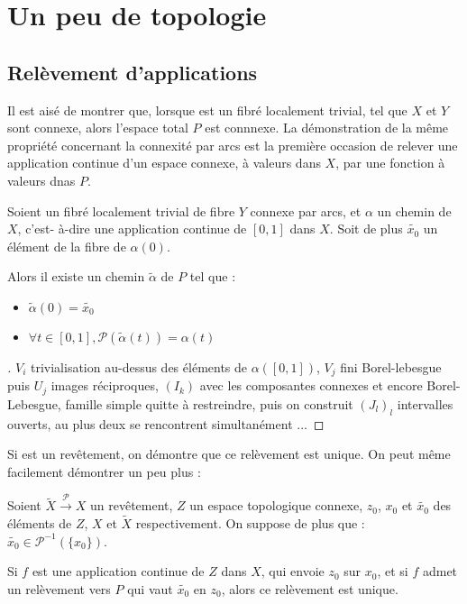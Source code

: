 
\section{Un peu de topologie}

\subsection{Rel\`evement d'applications}

Il est ais\'e de montrer que, lorsque \Fiy est un fibr\'e localement trivial, tel que $X$ et $Y$ sont connexe, alors l'espace total $P$ est connnexe. %
La d\'emonstration de la m\^eme propri\'et\'e concernant la connexit\'e par arcs est la premi\`ere occasion de relever une application continue d'un espace connexe, \`a valeurs dans $X$, %
par une fonction \`a valeurs dnas $P$.

\begin{prop}\label{rchefiy}
Soient \Fiy un fibr\'e localement trivial de fibre $Y$ connexe par arcs, et $\alpha$ un chemin de $X$, %
c'est- \`a-dire une application continue de $[0,1]$ dans $X$. %
Soit de plus $\tilde{x_0}$ un \'el\'ement de la fibre de $\alpha (0)$.

Alors il existe un chemin $\tilde{\alpha}$ de $P$ tel que :
\begin{itemize}
\item $\tilde{\alpha}(0)=\tilde{x_0}$
\item $\forall t \in [0,1] , \mathcal{P}(\tilde{\alpha}(t))=\alpha (t)$
\end{itemize}
\end{prop}

\begin{proof}[\es]
$V_i$ trivialisation au-dessus des \'el\'ements de $\alpha ([0,1])$, %
$V_j$ fini Borel-lebesgue puis $U_j$ images r\'eciproques, %
$(I_k)$ avec les composantes connexes et encore Borel-Lebesgue, famille simple quitte \`a restreindre,
puis on construit $(J_l)_l$ intervalles ouverts, au plus deux se rencontrent simultan\'ement ...
\end{proof}

Si \Fiy est un rev\^etement, on d\'emontre que ce rel\`evement est unique. On peut m\^eme facilement d\'emontrer un peu plus :

\begin{prop}\label{urc}
Soient $\tilde{X} \overset{\mathcal{P}}{\longrightarrow} X$ un rev\^etement, $Z$ un espace topologique connexe, %
$z_0$, $x_0$ et $\tilde{x_0}$ des \'el\'ements de $Z$, $X$ et $\tilde{X}$ respectivement. On suppose de plus que : $\tilde{x_0}\in\mathcal{P}^{-1}(\{x_0\})$.

Si $f$ est une application continue de $Z$ dans $X$, qui envoie $z_0$ sur $x_0$, et si $f$ admet un rel\`evement vers $P$ qui vaut $\tilde{x_0}$ en $z_0$, %
alors ce rel\`evement est unique.
\end{prop}

